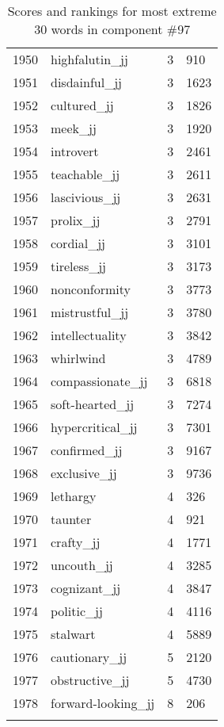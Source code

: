 \begin{longtable}[!htbp]{| rlr@{.}l |}
    1950 & highfalutin\_jj & 3 & 910 \\
    1951 & disdainful\_jj & 3 & 1623 \\
    1952 & cultured\_jj & 3 & 1826 \\
    1953 & meek\_jj & 3 & 1920 \\
    1954 & introvert & 3 & 2461 \\
    1955 & teachable\_jj & 3 & 2611 \\
    1956 & lascivious\_jj & 3 & 2631 \\
    1957 & prolix\_jj & 3 & 2791 \\
    1958 & cordial\_jj & 3 & 3101 \\
    1959 & tireless\_jj & 3 & 3173 \\
    1960 & nonconformity & 3 & 3773 \\
    1961 & mistrustful\_jj & 3 & 3780 \\
    1962 & intellectuality & 3 & 3842 \\
    1963 & whirlwind & 3 & 4789 \\
    1964 & compassionate\_jj & 3 & 6818 \\
    1965 & soft-hearted\_jj & 3 & 7274 \\
    1966 & hypercritical\_jj & 3 & 7301 \\
    1967 & confirmed\_jj & 3 & 9167 \\
    1968 & exclusive\_jj & 3 & 9736 \\
    1969 & lethargy & 4 & 326 \\
    1970 & taunter & 4 & 921 \\
    1971 & crafty\_jj & 4 & 1771 \\
    1972 & uncouth\_jj & 4 & 3285 \\
    1973 & cognizant\_jj & 4 & 3847 \\
    1974 & politic\_jj & 4 & 4116 \\
    1975 & stalwart & 4 & 5889 \\
    1976 & cautionary\_jj & 5 & 2120 \\
    1977 & obstructive\_jj & 5 & 4730 \\
    1978 & forward-looking\_jj & 8 & 206 \\
    \hline
    \caption{Scores and rankings for most extreme 30 words in component \#97} \\
\end{longtable}
